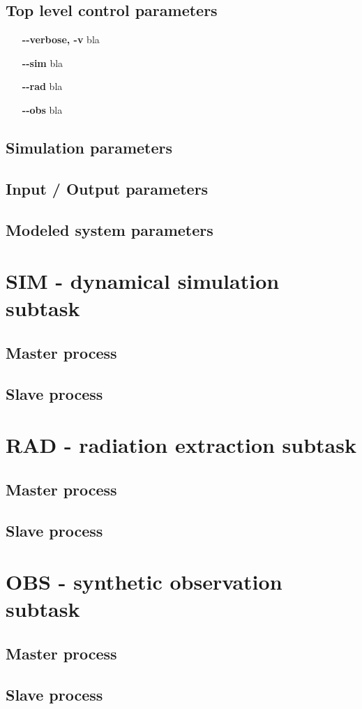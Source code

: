 \subsection{Top level control parameters}
    \begin{itemize}
        \item[\textbf{-{}-verbose, -v}] bla 
        \item[\textbf{-{}-sim}] bla 
        \item[\textbf{-{}-rad}] bla 
        \item[\textbf{-{}-obs}] bla  
    \end{itemize}

\subsection{Simulation parameters}
\subsection{Input / Output parameters}
\subsection{Modeled system parameters}

\section{SIM - dynamical simulation subtask}
\subsection{Master process}
\subsection{Slave process}

\section{RAD - radiation extraction subtask}
\subsection{Master process}
\subsection{Slave process}

\section{OBS - synthetic observation subtask}
\subsection{Master process}
\subsection{Slave process}
